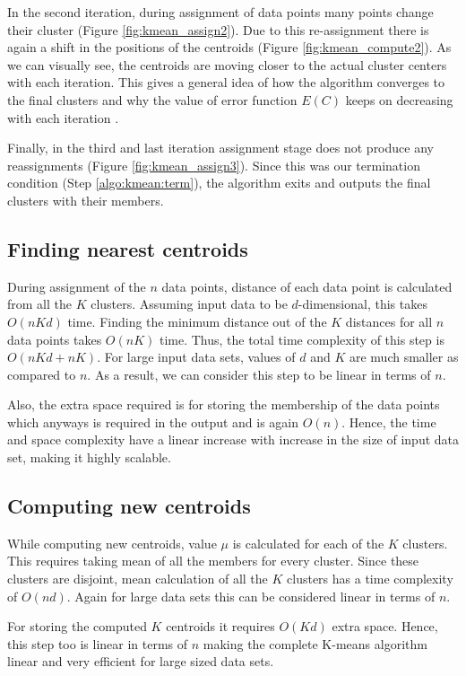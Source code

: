 In the second iteration, during assignment of data points many points change their cluster (Figure \ref{fig:kmean_assign2}). Due to this re-assignment there is again a shift in the positions of the centroids (Figure \ref{fig:kmean_compute2}). As we can visually see, the centroids are moving closer to the actual cluster centers with each iteration. This gives a general idea of how the algorithm converges to the final clusters and why the value of error function $E\left(C\right)$ keeps on decreasing with each iteration \cite{selim}.

Finally, in the third and last iteration assignment stage does not produce any reassignments (Figure \ref{fig:kmean_assign3}). Since this was our termination condition (Step \ref{algo:kmean:term}), the algorithm exits and outputs the final clusters with their members.

\subsection{Finding nearest centroids}\label{sec:findnearest}
During assignment of the $n$ data points, distance of each data point is calculated from all the $K$ clusters. Assuming input data to be $d$-dimensional, this takes $O(nKd)$ time. Finding the minimum distance out of the $K$ distances for all $n$ data points takes $O(nK)$ time. Thus, the total time complexity of this step is $O(nKd + nK)$. For large input data sets, values of $d$ and $K$ are much smaller as compared to $n$. As a result, we can consider this step to be linear in terms of $n$. 

Also, the extra space required is for storing the membership of the data points which anyways is required in the output and is again $O(n)$. Hence, the time and space complexity have a linear increase with increase in the size of input data set, making it highly scalable.

\subsection{Computing new centroids}
While computing new centroids, value $\mu$ is calculated for each of the $K$ clusters. This requires taking mean of all the members for every cluster. Since these clusters are disjoint, mean calculation of all the $K$ clusters has a time complexity of $O(nd)$. Again for large data sets this can be considered linear in terms of $n$.

For storing the computed $K$ centroids it requires $O(Kd)$ extra space. Hence, this step too is linear in terms of $n$ making the complete K-means algorithm linear and very efficient for large sized data sets.

